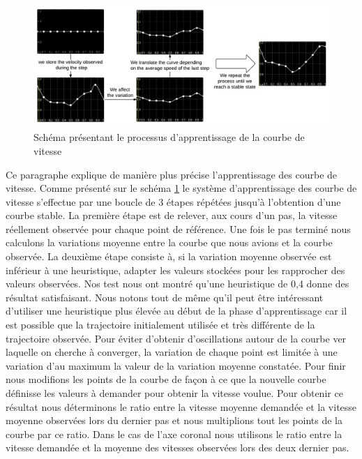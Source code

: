 \documentclass{llncs}
\begin{document}
\begin{figure}[h]
\centering
\includegraphics[scale=0.47]{speed_curve_learner.pdf}
\caption{Schéma présentant le processus d'apprentissage de la courbe de vitesse}
\label{fig:speed_curve_learner}
\end{figure}


Ce paragraphe explique de manière plus précise l'apprentissage des courbe de vitesse. Comme présenté sur le schéma \ref{fig:speed_curve_learner} le système d'apprentissage des courbe de vitesse s'effectue par une boucle de 3 étapes répétées jusqu'à l'obtention d'une courbe stable. La première étape est de relever, aux cours d'un pas, la vitesse réellement observée pour chaque point de référence. Une fois le pas terminé nous calculons la variations moyenne entre la courbe que nous avions et la courbe observée. La deuxième étape consiste à, si la variation moyenne observée est inférieur à une heuristique, adapter les valeurs stockées pour les rapprocher des valeurs observées. Nos test nous ont montré qu'une heuristique de 0,4 donne des résultat satisfaisant. Nous notons tout de même qu'il peut être intéressant d'utiliser une heuristique plus élevée au début de la phase d'apprentissage car il est possible que la trajectoire initialement utilisée et très différente de la trajectoire observée.  Pour éviter d'obtenir d'oscillations autour de la courbe ver laquelle on cherche à converger, la variation de chaque point est limitée à une variation d'au maximum la valeur de la variation moyenne constatée. Pour finir nous modifions les points de la courbe de façon à ce que la nouvelle courbe définisse les valeurs à demander pour obtenir la vitesse voulue. Pour obtenir ce résultat nous déterminons le ratio entre la vitesse moyenne demandée et la vitesse moyenne observées lors du dernier pas et nous multiplions tout les points de la courbe par ce ratio. Dans le cas de l'axe coronal nous utilisons le ratio entre la vitesse demandée et la moyenne des vitesses observées lors des deux dernier pas.
\end{document}
